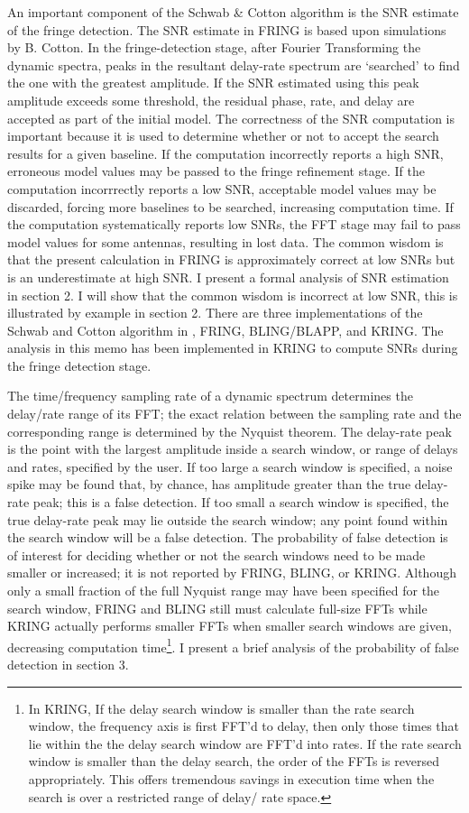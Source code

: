 An important component of the Schwab \& Cotton algorithm is the SNR
estimate of the fringe detection.  The SNR estimate in FRING is based
upon simulations by B. Cotton.  In the fringe-detection stage, after Fourier Transforming the dynamic spectra,  peaks
in the resultant delay-rate spectrum are `searched' to find the one
with the greatest amplitude.  If the SNR estimated using this peak
amplitude exceeds some threshold, the residual phase, rate, and delay
are accepted as part of the initial model.  The correctness of the SNR
computation is important because it is used to determine whether or
not to accept the search results for a given baseline.  If the
computation incorrectly reports a high SNR, erroneous model values may
be passed to the fringe refinement stage.  If the computation
incorrrectly reports a low SNR, acceptable model values may be
discarded, forcing more baselines to be searched, increasing
computation time.  If the computation systematically reports low SNRs,
the FFT stage may fail to pass model values for some antennas,
resulting in lost data.  The common wisdom is that the present
calculation in FRING is approximately correct at low SNRs but is an
underestimate at high SNR.  I present a formal analysis of SNR
estimation in section 2.  I will show that the common wisdom is
incorrect at low SNR, this is illustrated by example in section 2.
There are three implementations of the Schwab and Cotton algorithm in
\AIPS, FRING, BLING/BLAPP, and KRING.  The analysis in this memo has
been implemented in KRING to compute SNRs during the fringe detection
stage.

The time/frequency sampling rate of a dynamic spectrum determines the
delay/rate range of its FFT; the exact relation between the sampling
rate and the corresponding range is determined by the Nyquist theorem.
The delay-rate peak is the point with the largest amplitude inside a
search window, or range of delays and rates, specified by the user.
If too large a search window is specified, a noise spike may be found
that, by chance, has amplitude greater than the true delay-rate peak;
this is a false detection.  If too small a search window is specified,
the true delay-rate peak may lie outside the search window; any point
found within the search window will be a false detection.  The
probability of false detection is of interest for deciding whether or
not the search windows need to be made smaller or increased; it is not
reported by FRING, BLING, or KRING.  Although only a small fraction of
the full Nyquist range may have been specified for the search window,
FRING and BLING still must calculate full-size FFTs while KRING
actually performs smaller FFTs when smaller search windows are given,
decreasing computation time\footnote{In KRING, If the delay search window is
smaller than the rate search window, the frequency axis is first FFT'd to
delay, then only those times that lie within the the delay search window are
FFT'd into rates.  If the rate search window is smaller than the delay search,
the order of the FFTs is reversed appropriately.  This offers tremendous
savings in execution time when the search is over a restricted range of delay/
rate space.}.  I present a brief analysis of the
probability of false detection in section 3.

